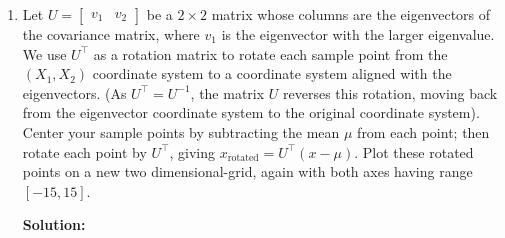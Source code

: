 \documentclass{article}
\newcommand{\solution}{\textbf{Solution: }}
\begin{document}
\begin{enumerate}[label=(\alph*)]
    \item Let $U = \begin{bmatrix} v_1 & v_2 \end{bmatrix}$ be a $2 \times 2$ matrix whose columns are the eigenvectors of the covariance matrix, where $v_1$ is the eigenvector with the larger eigenvalue. We use $U^{\top}$ as a rotation matrix to rotate each sample point from the $(X_1, X_2)$  coordinate system to a coordinate system aligned with the eigenvectors. (As $U^{\top} = U^{-1}$, the matrix $U$ reverses this rotation, moving back from the eigenvector coordinate system to the original coordinate system). Center your sample points by subtracting the mean $\mu$ from each point; then rotate each point by $U^{\top}$, giving $x_{\text{rotated}} = U^{\top}(x - \mu)$.  Plot these rotated points on a new two dimensional-grid, again with both axes having range $[-15, 15]$.
    \begin{mdframed} \solution
    \end{mdframed}

\end{enumerate}

\newpage
\end{document}
